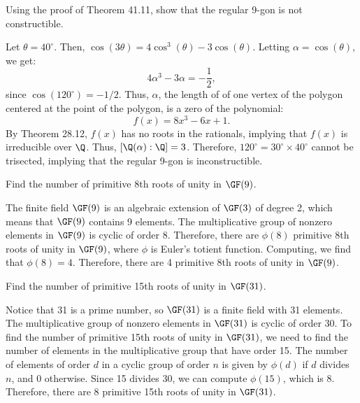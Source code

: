 \begin{problem}[41.3]
  Using the proof of Theorem 41.11, show that the regular 9-gon is not constructible.
\end{problem}

\begin{solution}
  Let $\theta = 40^\circ$. Then, $\cos(3\theta) = 4\cos^3(\theta) - 3\cos(\theta)$. Letting $\alpha = \cos(\theta)$, we get:
  \[%
    4\alpha^3 - 3\alpha = -\frac{1}{2}
  ,\]%
  since $\cos(120^\circ) = -1/2$. Thus, $\alpha$, the length of of one vertex of the polygon centered at the point of the polygon, is a zero of the polynomial:
  \[%
    f(x) = 8x^3 - 6x + 1
  .\]%
  By Theorem 28.12, $f(x)$ has no roots in the rationals, implying that $f(x)$ is irreducible over $\Q$. Thus, $[\Q(\alpha) : \Q] = 3$. Therefore, $120^\circ = 30^\circ \times 40^\circ$ cannot be trisected, implying that the regular 9-gon is inconstructible.
\end{solution}

\begin{problem}[42.4]
  Find the number of primitive 8th roots of unity in $\GF(9)$.
\end{problem}

\begin{solution}
  The finite field $\GF(9)$ is an algebraic extension of $\GF(3)$ of degree 2, which means that $\GF(9)$ contains 9 elements. The multiplicative group of nonzero elements in $\GF(9)$ is cyclic of order 8. Therefore, there are $\phi(8)$ primitive 8th roots of unity in $\GF(9)$, where $\phi$ is Euler's totient function. Computing, we find that $\phi(8) = 4$. Therefore, there are 4 primitive 8th roots of unity in $\GF(9)$.
\end{solution}

\begin{problem}[42.6]
  Find the number of primitive 15th roots of unity in $\GF(31)$.
\end{problem}

\begin{solution}
  Notice that 31 is a prime number, so $\GF(31)$ is a finite field with 31 elements. The multiplicative group of nonzero elements in $\GF(31)$ is cyclic of order 30. To find the number of primitive 15th roots of unity in $\GF(31)$, we need to find the number of elements in the multiplicative group that have order 15. The number of elements of order $d$ in a cyclic group of order $n$ is given by $\phi(d)$ if $d$ divides $n$, and 0 otherwise. Since 15 divides 30, we can compute $\phi(15)$, which is 8. Therefore, there are 8 primitive 15th roots of unity in $\GF(31)$.
\end{solution}

